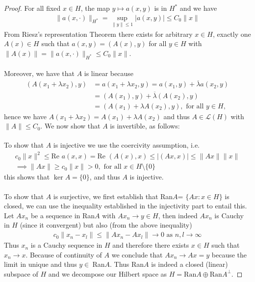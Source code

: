 \documentclass[11pt,a4paper]{article}
\theoremstyle{definition}
\begin{document}
\begin{proof}
For all fixed $x \in H$, the map $y \mapsto a(x,y)$ is in $H^*$ and we have 
\begin{align*}
\| a(x, \cdot) \|_{H^*} = \sup_{ \|y \| \leq 1 } | a(x,y)| \leq C_0 \|x\|
\end{align*}
From Riesz's representation Theorem there exists for arbitrary $x \in H$, exactly one $A(x) \in H$ such that $a(x,y)=(A(x),y)$ for all $y \in H$ with $\|A(x)\| = \| a(x, \cdot) \|_{H^*} \leq C_0 \|x\|$. 
\\\\
Moreover, we have that $A$ is linear because 
\begin{align*}
(A(x_1 + \lambda x_2), y)&= a(x_1 + \lambda x_2, y) = a(x_1,y) + \overline{\lambda}a (x_2,y)\\
& = (A(x_1), y) + \overline{\lambda}(A(x_2),y) \\
& = (A(x_1) + \lambda A(x_2),y), \text{ for all } y \in H,
\end{align*}
hence we have $A(x_1 + \lambda x_2)= A(x_1) + \lambda A(x_2)$ and thus $A \in \mathcal{L}(H)$ with $\| A \| \leq C_0$. We now show that $A$ is invertible, as follows: \\
\\
To show that $A$ is injective we use the coercivity assumption, i.e. 
\begin{align*}
c_0 \| x \|^2 \leq \text{Re } a(x,x) = \text{Re } (A(x),x) \leq | (Ax,x)| \leq \| Ax\| \| x \| \\
\implies \|Ax\| \geq c_0 \|x\| >0, \text{ for all } x \in H \setminus \lbrace 0 \rbrace
\end{align*}
this shows that $\ker A = \lbrace 0 \rbrace$, and thus $A$ is injective. 
\\\\
To show that $A$ is surjective, we first establish that Ran$A$= $\lbrace Ax: x \in H \rbrace$ is closed, we can use the inequality established in the injectivity part to entail this. Let $Ax_n$ be a sequence in Ran$A$ with $Ax_n \to y \in H$, then indeed $Ax_n$ is Cauchy in $H$ (since it convergent) but also (from the above inequality)
\begin{align*}
c_0 \| x_n - x_l \| \leq \| Ax_n - Ax_l \| \to 0 \text{ as } n,l \to \infty 
\end{align*}
Thus $x_n$ is a Cauchy sequence in $H$ and therefore there exists $x \in H$ such that $x_n \to x$. Because of continuity of $A$ we conclude that $Ax_n \to Ax=y$ because the limit in unique and thus $y \in \ $Ran$A$. Thus Ran$A$ is indeed a closed (linear) subspace of $H$ and we decompose our Hilbert space as $H= \text{Ran}A \oplus \text{Ran}A^\perp$. 

\end{proof}
\end{document}
